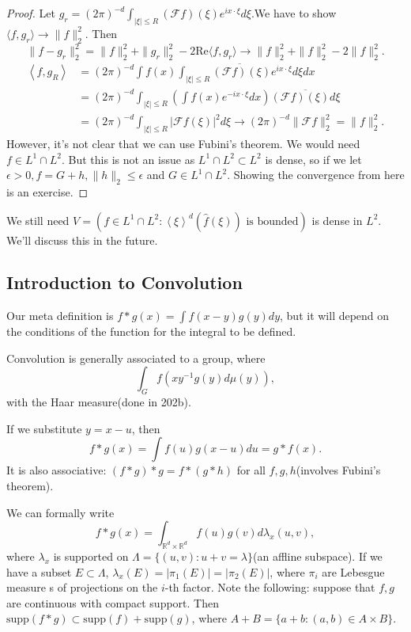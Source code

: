 \documentclass[11pt]{scrartcl}
\newcommand{\R}{\mathbb{R}}
\let \hat \widehat
\newcommand{\<}{\langle}
\renewcommand{\>}{\rangle}
\begin{document}
\begin{proof}
Let $g_r = (2\pi)^{-d}\int_{|\xi| \le R} (\mathscr{F}f)(\xi)e^{ix\cdot \xi}d\xi$.We have to show $\langle f, g_r \rangle \rightarrow \|f\|_2^2$.  Then
$$\|f - g_r\|_2^2 = \|f\|_2^2 + \|g_r\|_2^2 - 2 \text{Re}\langle f, g_r \rangle \rightarrow \|f\|_2^2 + \|f\|_2^2 - 2 \|f\|_2^2.$$
\begin{align*}
\left <f, g_R\right > &= (2\pi)^{-d} \int f(x) \overline{\int_{|\xi| \le R} (\mathscr{F}f)(\xi)e^{ix \cdot \xi}d\xi} dx\\
&= (2\pi)^{-d} \int_{|\xi| \le R} \left (\int f(x)e^{-ix \cdot \xi} dx\right ) \overline{(\mathscr{F}f)(\xi) d\xi}\\
&= (2\pi)^{-d} \int_{|\xi| \le R} |\mathscr{F}f(\xi)|^2 d\xi \rightarrow (2\pi)^{-d} \|\mathscr{F}f\|_2^2 = \|f\|_2^2.
\end{align*}
However, it's not clear that we can use Fubini's theorem.  We would need $f \in L^1 \cap L^2$.  But this is not an issue as $L^1 \cap L^2 \subset L^2$ is dense, so if we let $\epsilon > 0, f = G+h, \|h\|_2 \le \epsilon$ and $G \in L^1 \cap L^2$.  Showing the convergence from here is an exercise.
\end{proof}
We still need $V = (f \in L^1 \cap L^2 : \left <\xi\right>^d (\hat{f}(\xi)) \text{ is bounded})$ is dense in $L^2$.  We'll discuss this in the future.
\subsection{Introduction to Convolution}
Our meta definition is $f * g(x) = \int f(x-y)g(y) dy$, but it will depend on the conditions of the function for the integral to be defined.

 Convolution is generally associated to a group, where
$$\int_G f(xy^{-1}g(y)d\mu(y)),$$
with the Haar measure(done in 202b).

If we substitute $y = x-u$, then $$f *g(x) = \int f(u)g(x-u)du = g * f(x).$$  It is also associative: $(f * g)* g = f * (g * h)$ for all $f, g, h$(involves Fubini's theorem).

We can formally write
$$f * g(x) = \int_{\R^d \times \R^d} f(u)g(v) d\lambda_x(u, v),$$
where $\lambda_x$ is supported on $\Lambda = \{(u, v) : u+v = \lambda \}$(an affline subspace).  If we have a subset $E \subset \Lambda$, $\lambda_x(E) = |\pi_1(E)| = |\pi_2(E)|$, where $\pi_i$ are Lebesgue measure s of projections on the $i$-th factor.  Note the following: suppose that $f, g$ are continuous with compact support.  Then $\text{supp}(f * g) \subset \text{supp}(f) + \text{supp}(g)$, where $A + B = \{a+b : (a, b) \in A \times B\}$.
\end{document}

